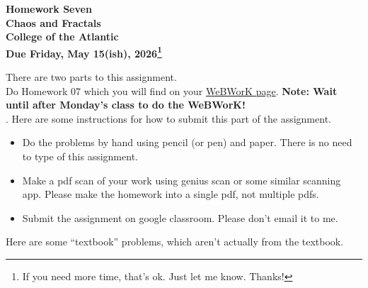 \documentclass[12pt]{extarticle}
\begin{document}
\pagestyle{empty}
 
\begin{center}
{\LARGE {\bf Homework Seven}}\\
\bigskip
{\Large {\bf Chaos and Fractals}}\\
\bigskip
{\Large {\bf College of the Atlantic}}\\
\bigskip
{ {\bf Due Friday, May 15(ish), 2026\footnote{If you need more time,
      that's ok. Just let me know. Thanks!}}}\\  
\end{center}
\medskip


\noindent There are two parts to this assignment.\\

 Do Homework 07 which you will find on your  
\href{https://webwork-hosting.runestone.academy/webwork2/coa-feldman-es1026i-spring2026}{WeBWorK 
  page}. \textbf{Note: Wait until after Monday's class to do the WeBWorK!}\\ 


.  Here are some
instructions for how to submit this part of the assignment.
\begin{itemize}
\item Do the problems by hand using pencil (or pen) and paper.
  There is no need to type of this assignment.
\item Make a pdf scan of your work using genius scan or some
  similar scanning app. Please make the homework into a single
  pdf, not multiple pdfs.
\item Submit the assignment on google classroom.  Please don't
  email it to me. 
\end{itemize}

\noindent Here are some ``textbook'' problems, which aren't actually
from the textbook.
\end{document}
